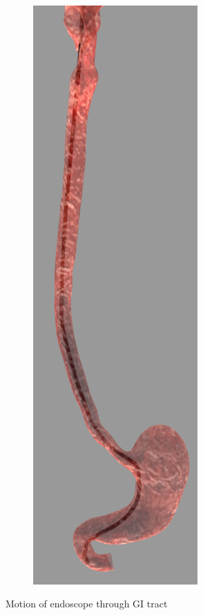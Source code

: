 \documentclass[12pt,a4]{article}
\begin{document}
\begin{figure}[ht!]
\begin{subfigure}{0.15\textwidth}
    \end{subfigure}%
    ~
        \begin{subfigure}{0.15\textwidth}
        \centering
        \includegraphics[width=0.75\linewidth]{figures/GIsnaps/6.png}
        
    \end{subfigure}%
    
    \caption{ Motion of endoscope through GI tract}
\end{figure}
\end{document}
